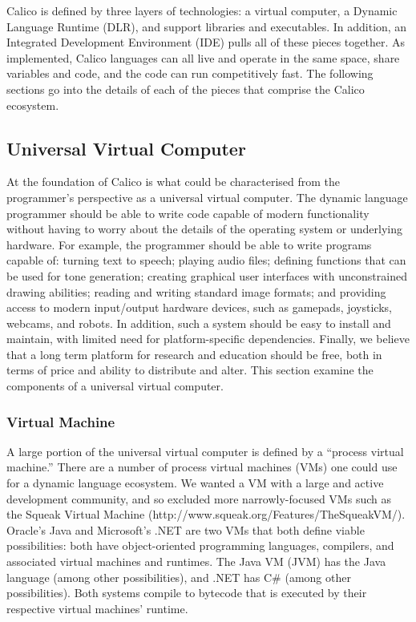 \documentclass[preprint]{sigplanconf}
\begin{document}
Calico is defined by three layers of technologies: a virtual computer,
a Dynamic Language Runtime (DLR), and support libraries and
executables. In addition, an Integrated Development Environment (IDE)
pulls all of these pieces together. As implemented, Calico languages
can all live and operate in the same space, share variables and code,
and the code can run competitively fast. The following sections go
into the details of each of the pieces that comprise the Calico
ecosystem.

\subsection{Universal Virtual Computer}

At the foundation of Calico is what could be characterised from the
programmer's perspective as a universal virtual computer. The dynamic
language programmer should be able to write code capable of modern
functionality without having to worry about the details of the
operating system or underlying hardware. For example, the programmer
should be able to write programs capable of: turning text to speech;
playing audio files; defining functions that can be used for tone
generation; creating graphical user interfaces with unconstrained
drawing abilities; reading and writing standard image formats; and
providing access to modern input/output hardware devices, such as
gamepads, joysticks, webcams, and robots. In addition, such a system
should be easy to install and maintain, with limited need for
platform-specific dependencies. Finally, we believe that a long term
platform for research and education should be free, both in terms of
price and ability to distribute and alter. This section examine the
components of a universal virtual computer.

\subsubsection{Virtual Machine}

A large portion of the universal virtual computer is defined by a
``process virtual machine.'' There are a number of process virtual
machines (VMs) one could use for a dynamic language ecosystem. We
wanted a VM with a large and active development community, and so
excluded more narrowly-focused VMs such as the Squeak Virtual Machine
(http://www.squeak.org/Features/TheSqueakVM/). Oracle's Java and
Microsoft's .NET are two VMs that both define viable possibilities:
both have object-oriented programming languages, compilers, and
associated virtual machines and runtimes. The Java VM (JVM) has the
Java language (among other possibilities), and .NET has C\# (among
other possibilities). Both systems compile to bytecode that is
executed by their respective virtual machines' runtime.
\end{document}
